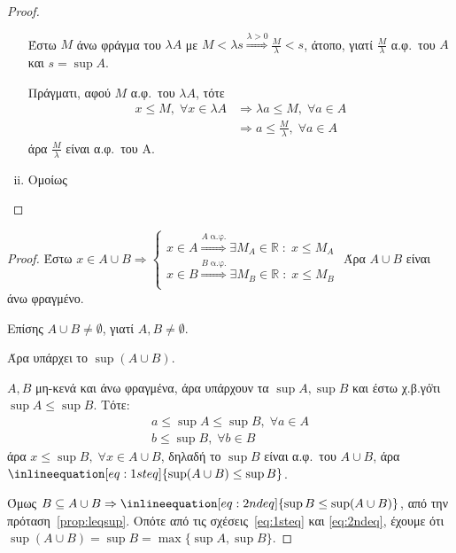 \documentclass[main.tex]{subfiles}
\begin{document}
\begin{proof}
\begin{enumerate}[(i)]
\begin{myitemize}
          Έστω $M$ άνω φράγμα του $ \lambda A $ με $ M < \lambda s 
          \overset{\lambda >0} {\Rightarrow} \frac{M}{\lambda} < s  $, 
          άτοπο, γιατί $ \frac{ M}{\lambda} $ α.φ.\ του $A$ και $ s= \sup A $.

          Πράγματι, αφού $ M $ α.φ.\ του $ \lambda A $, τότε
          \begin{align*}
            x \leq M, \; \forall x \in \lambda A 
            &\Rightarrow \lambda a \leq M, \; \forall a \in A \\
            &\Rightarrow a \leq \frac{M}{\lambda}, \; \forall a \in A
          \end{align*} 
          άρα $ \frac{M}{\lambda} $ είναι α.φ.\ του Α.
      \end{myitemize}

    \item Ομοίως
  \end{enumerate}
\end{proof}


\begin{proof}
  Έστω $ x \in A \cup B \Rightarrow \begin{cases} x \in A \overset{A \; \text{α.φ.}}{
    \Rightarrow} \exists M_{A} \in \mathbb{R} \; : \; x \leq M_{A} \\
    x \in B \overset{B \; \text{α.φ.}}{ \Rightarrow} \exists M_{B} \in \mathbb{R} 
    \; : \; x \leq M_{B}  \\
  \end{cases} $  
  Άρα $ A \cup B $ είναι άνω φραγμένο.

  Επίσης $ A \cup B \neq \emptyset $, γιατί $ A, B \neq \emptyset $. 

  Άρα υπάρχει το $ \sup (A \cup B) $.

  $ A,B $ μη-κενά και άνω φραγμένα, άρα υπάρχουν τα $ \sup A, \sup B $ 
  και έστω χ.β.γ\.  ότι $ \sup A \leq \sup B $. Τότε:
  \begin{gather*}
    a \leq \sup A \leq \sup B, \; \forall a \in A \\
    b \leq \sup B, \; \forall b \in B 
  \end{gather*}
  άρα $ x \leq \sup B, \; \forall x \in A \cup B  $, δηλαδή το $ \sup B $ 
  είναι α.φ.\ του $ A \cup B $, άρα $ \inlineequation[eq:1steq]{\sup (A \cup B) 
  \leq \sup B} $.

  Όμως $ B \subseteq A \cup B \Rightarrow \inlineequation[eq:2ndeq]{\sup B \leq 
  \sup (A \cup B)} $, από την πρόταση~\ref{prop:leqsup}. 
  Οπότε από τις σχέσεις~\eqref{eq:1steq} και \eqref{eq:2ndeq}, έχουμε ότι $
  \sup (A \cup B) = \sup B = \max \{ \sup A, \sup B \} $.
\end{proof}
\end{document}
